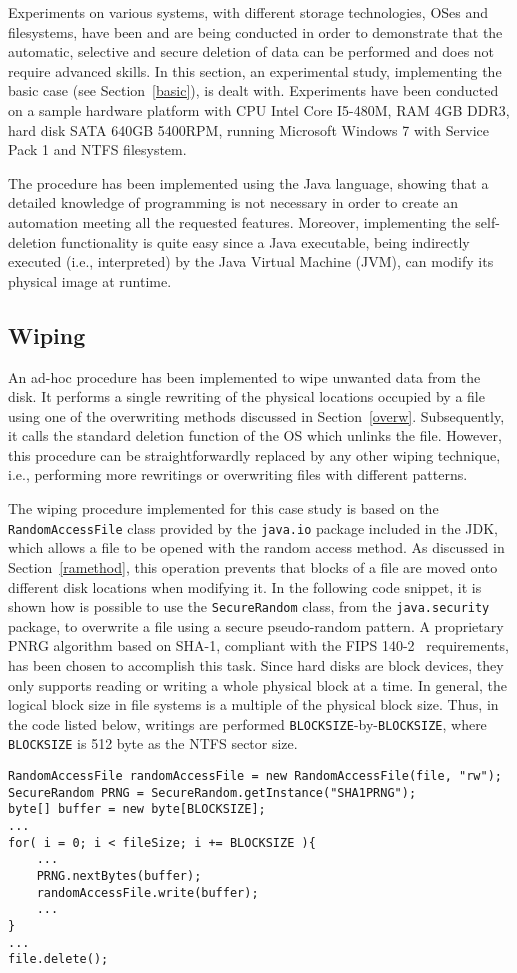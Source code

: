 \documentclass[conference]{IEEEtran}
\begin{document}
Experiments on various systems, with different storage technologies, OSes and filesystems, have been and are being conducted in order to demonstrate that the automatic, selective and secure deletion of data can be performed and does not require advanced skills.
In this section, an experimental study, implementing the basic case (see Section~\ref{basic}), is dealt with. Experiments have been conducted on
a sample hardware platform with CPU Intel Core I5-480M, RAM 4GB DDR3, hard disk SATA 640GB 5400RPM, running Microsoft Windows 7 with Service Pack 1 and NTFS filesystem.


The procedure has been implemented using the Java language, showing that a detailed knowledge of programming is not necessary in order to create an automation meeting all the requested features. Moreover, implementing the self-deletion functionality is quite easy since a Java executable, being indirectly executed (i.e., interpreted) by the Java Virtual Machine (JVM), can modify its physical image at runtime.

\subsection{Wiping}
\label{case_wiping}
An ad-hoc procedure has been implemented to wipe unwanted data from the disk. It performs a single rewriting of the physical locations occupied by a file using one of the overwriting methods discussed in Section~\ref{overw}. Subsequently, it calls the standard deletion function of the OS which unlinks the file. However, this procedure can be straightforwardly replaced by any other wiping technique, i.e., performing more rewritings or overwriting files with different patterns.

The wiping procedure implemented for this case study is based on the \verb=RandomAccessFile= class provided by the \verb=java.io= package included in the JDK, which allows a file to be opened with the random access method. As discussed in Section~\ref{ramethod}, this operation prevents that blocks of a file are moved onto different disk locations when modifying it.
In the following code snippet, it is shown how is possible to use the \verb=SecureRandom= class, from the \verb=java.security= package, to overwrite a file using a secure pseudo-random pattern. A proprietary PNRG algorithm based on SHA-1, compliant with the FIPS 140-2~\cite{secrand} requirements, has been chosen to accomplish this task.
Since hard disks are block devices, they only supports reading or writing a whole physical block at a time. In general, the logical block size in file systems is a multiple of the physical block size. Thus, in the code listed below, writings are performed \verb=BLOCKSIZE=-by-\verb=BLOCKSIZE=, where \verb=BLOCKSIZE= is 512 byte as the NTFS sector size.
\begin{lstlisting}
RandomAccessFile randomAccessFile = new RandomAccessFile(file, "rw");
SecureRandom PRNG = SecureRandom.getInstance("SHA1PRNG");
byte[] buffer = new byte[BLOCKSIZE];
...
for( i = 0; i < fileSize; i += BLOCKSIZE ){	
    ...
	PRNG.nextBytes(buffer);
	randomAccessFile.write(buffer);
    ... 
}
...
file.delete();
\end{lstlisting}
\end{document}
